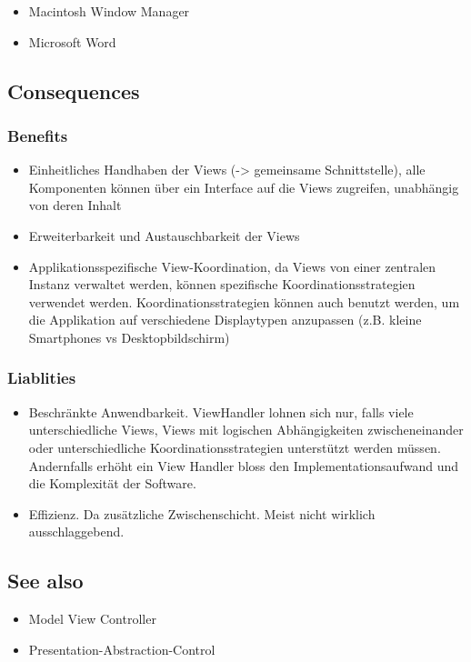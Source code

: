 \begin{itemize}
	\item Macintosh Window Manager
	\item Microsoft Word
\end{itemize}

\subsection*{Consequences}


\subsubsection*{Benefits}


\begin{itemize}
	\item Einheitliches Handhaben der Views (-> gemeinsame Schnittstelle), alle Komponenten können über ein Interface auf die Views zugreifen, unabhängig von deren Inhalt
	\item Erweiterbarkeit und Austauschbarkeit der Views
	\item Applikationsspezifische View-Koordination, da Views von einer zentralen Instanz verwaltet werden, können spezifische Koordinationsstrategien verwendet werden. Koordinationsstrategien können auch benutzt werden, um die Applikation auf verschiedene Displaytypen anzupassen (z.B. kleine Smartphones vs Desktopbildschirm)
\end{itemize}

\subsubsection*{Liablities}


\begin{itemize}
	\item Beschränkte Anwendbarkeit. ViewHandler lohnen sich nur, falls viele unterschiedliche Views, Views mit logischen Abhängigkeiten zwischeneinander oder unterschiedliche Koordinationsstrategien unterstützt werden müssen. Andernfalls erhöht ein View Handler bloss den Implementationsaufwand und die Komplexität der Software.
	\item Effizienz. Da zusätzliche Zwischenschicht. Meist nicht wirklich ausschlaggebend.
\end{itemize}

\subsection*{See also}

\begin{itemize}
	\item Model View Controller
	\item Presentation-Abstraction-Control
\end{itemize}


